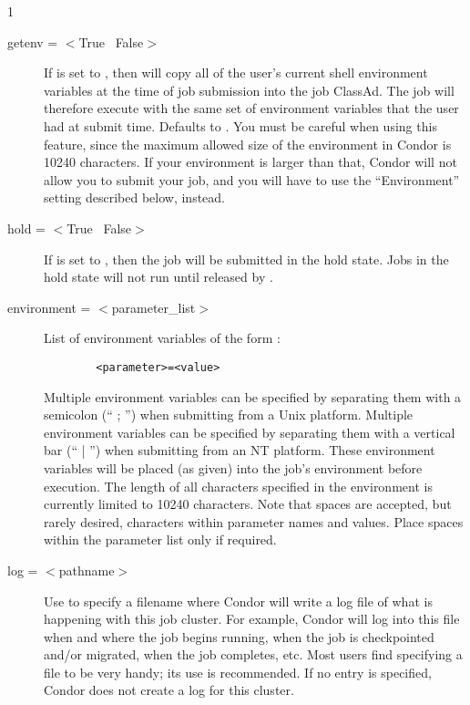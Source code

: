 \begin{ManPage}{\label{man-condor-submit}}{1}
\begin{description}

\item[getenv = $<$True \Bar\ False$>$] If  is set to
, then  will copy all of the user's current
shell environment variables at the time of job submission into the job
ClassAd. The job will therefore execute with the same set of environment
variables that the user had at submit time. Defaults to .
You must be careful when using this feature, since the maximum allowed
size of the environment in Condor is 10240 characters.  
If your environment is larger than that, Condor will not allow you to
submit your job, and you will have to use the ``Environment'' setting
described below, instead.


\item[hold = $<$True \Bar\ False$>$] If  is set to
, then the job will be submitted in the hold state.  Jobs in
the hold state will not run until released by .


\item[environment = $<$parameter\_list$>$] List of environment variables
of the form :
\begin{verbatim}
        <parameter>=<value>
\end{verbatim}
Multiple environment variables can be specified by separating them with a
semicolon (`` ; '') when submitting from a Unix platform.
Multiple environment variables can be specified by separating them with a
vertical bar (`` | '') when submitting from an NT platform.
These environment variables will be placed (as given) into the
job's environment before execution. The length of all characters
specified in the environment is currently limited to 10240 characters.  
Note that spaces are accepted, but rarely desired,
characters within parameter names and values.
Place spaces within the parameter list only if required.


\item[log = $<$pathname$>$] Use  to specify a filename where
Condor will write a log file of what is happening with this job cluster.
For example, Condor will log into this file when and where the job
begins running, when the job is checkpointed and/or migrated, when the
job completes, etc. Most users find specifying a  file to be very
handy; its use is recommended. If no  entry is specified, 
Condor does not create a log for this cluster.


\end{description}
\end{ManPage}
